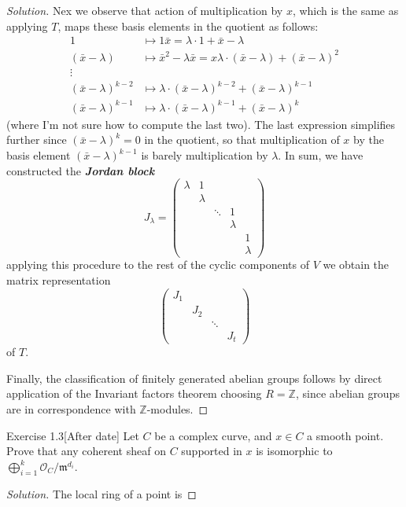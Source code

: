 \begin{proof}[Solution]
Nex we observe that action of multiplication by $x$, which is the same as applying $T$, maps these basis elements in the quotient as follows:
\begin{align*}
	1&\mapsto 1\bar{x}=\lambda\cdot 1+\bar{x}-\lambda\\
	(\bar{x}-\lambda)&\mapsto \bar{x}^2-\lambda\bar{x}=x\lambda\cdot (\bar{x}-\lambda)+(\bar{x}-\lambda)^2\\
	\vdots & \\
	(\bar{x}-\lambda)^{k-2}&\mapsto \lambda\cdot (\bar{x}-\lambda)^{k-2}+(\bar{x}-\lambda)^{k-1}\\
	(\bar{x}-\lambda)^{k-1}&\mapsto \lambda\cdot (\bar{x}-\lambda)^{k-1}+(\bar{x}-\lambda)^k
\end{align*}
(where I'm not sure how to compute the last two). The last expression simplifies further since $(\bar{x}-\lambda)^k=0$ in the quotient, so that multiplication of $x$ by the basis element $( \bar{x}-\lambda)^{k-1}$ is barely multiplication by $\lambda$. In sum, we have constructed the  \textit{\textbf{Jordan block}}
\[J_{\lambda}=\begin{pmatrix} \lambda &1\\
&\lambda\\
&&\ddots&1\\
&&&\lambda\\
&&&&1\\
&&&&\lambda
\end{pmatrix} \]
applying this procedure to the rest of the cyclic components of $V$ we obtain the  matrix representation
 \[\begin{pmatrix} J_1\\
 &J_2\\
 &&\ddots\\
 &&&J_t\end{pmatrix} \]
of $T$.

Finally, the classification of finitely generated abelian groups follows by direct application of the Invariant factors theorem choosing $R=\mathbb{Z}$, since abelian groups are in correspondence with $\mathbb{Z}$-modules.
\end{proof}

\begin{idea5}{Exercise 1.3}[After date]\leavevmode
	Let $C$ be a  complex curve, and $x\in C$ a smooth point. Prove that any coherent sheaf on $C$ supported in $x$ is isomorphic to $\bigoplus_{i=1}^k \mathcal{O}_C/\mathfrak{m}^{d_i} $.
\end{idea5}

\begin{proof}[Solution]\leavevmode
	The local ring of a point is 
\end{proof}

